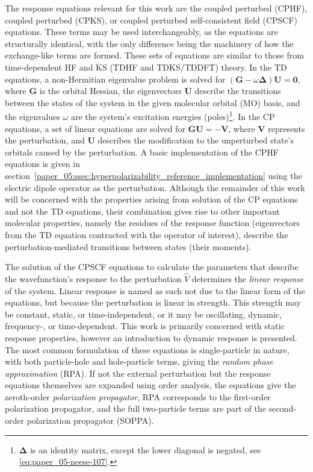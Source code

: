 \documentclass[%
class = book,%
crop = false,%
float = true,%
multi = true,%
preview = false,%
]{standalone}
\begin{document}
The response equations relevant for this work are the coupled perturbed \hf{} (CPHF), coupled perturbed \ks{} (CPKS), or coupled perturbed self-consistent field (CPSCF) equations. These terms may be used interchangeably, as the equations are structurally identical, with the only difference being the machinery of how the exchange-like terms are formed. These sets of equations are similar to those from time-dependent HF and KS (TDHF and TDKS/TDDFT) theory. In the TD equations, a non-Hermitian eigenvalue problem is solved for \((\mathbf{G} - \omega\bm{\Delta})\mathbf{U} = \mathbf{0}\), where \(\mathbf{G}\) is the orbital Hessian, the eigenvectors \(\mathbf{U}\) describe the transitions between the states of the system in the given molecular orbital (MO) basis, and the eigenvalues \(\omega\) are the system's excitation energies (poles)\footnote{\(\bm{\Delta}\) is an identity matrix, except the lower diagonal is negated, see \eqref{eq:paper_05-neese-107}.}. In the \hypertarget{text:response-equation-description}{CP equations}, a set of linear equations are solved for \(\mathbf{GU} = -\mathbf{V}\), where \(\mathbf{V}\) represents the perturbation, and \(\mathbf{U}\) describes the modification to the unperturbed state's orbitals caused by the perturbation. A basic implementation of the CPHF equations is given in section~\ref{paper_05:ssec:hyperpolarizability_reference_implementation} using the electric dipole operator as the perturbation. Although the remainder of this work will be concerned with the properties arising from solution of the CP equations and not the TD equations, their combination gives rise to other important molecular properties, namely the residues of the response function (eigenvectors from the TD equation contracted with the operator of interest), describe the perturbation-mediated transitions between states (their moments).

The solution of the CPSCF equations to calculate the parameters that describe the wavefunction's response to the perturbation \(\hat{V}\) determines the \emph{linear response} of the system. Linear response is named as such not due to the linear form of the equations, but because the perturbation is linear in strength. This strength may be constant, static, or time-independent, or it may be oscillating, dynamic, frequency-, or time-dependent. This work is primarily concerned with static response properties, however an introduction to dynamic response is presented. The most common formulation of these equations is single-particle in nature, with both particle-hole and hole-particle terms, giving the \emph{random phase approximation} (RPA)\cite{Scheffler2012,doi:10.1021/cr0505627}. If not the external perturbation but the response equations themselves are expanded using order analysis, the \hf{} equations give the zeroth-order \emph{polarization propagator}, RPA corresponds to the first-order polarization propagator, and the full two-particle terms are part of the second-order polarization propagator (SOPPA)\cite{ODDERSHEDE198433}.
\end{document}
